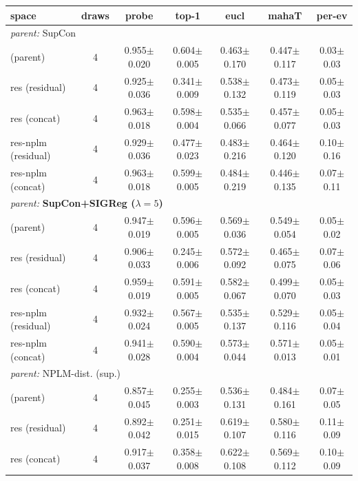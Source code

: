 \begin{table}[t]
\centering
\footnotesize
\begin{tabular}{lcccccc}
\toprule
space & draws & probe & top-1 & eucl & mahaT & per-ev \\
\midrule
\multicolumn{7}{l}{\emph{parent: }SupCon} \\
\quad (parent) & 4 & 0.955$\pm$0.020 & 0.604$\pm$0.005 & 0.463$\pm$0.170 & 0.447$\pm$0.117 & 0.03$\pm$0.03 \\
\quad res (residual) & 4 & 0.925$\pm$0.036 & 0.341$\pm$0.009 & 0.538$\pm$0.132 & 0.473$\pm$0.119 & 0.05$\pm$0.03 \\
\quad res (concat) & 4 & 0.963$\pm$0.018 & 0.598$\pm$0.004 & 0.535$\pm$0.066 & 0.457$\pm$0.077 & 0.05$\pm$0.03 \\
\quad res-nplm (residual) & 4 & 0.929$\pm$0.036 & 0.477$\pm$0.023 & 0.483$\pm$0.216 & 0.464$\pm$0.120 & 0.10$\pm$0.16 \\
\quad res-nplm (concat) & 4 & 0.963$\pm$0.018 & 0.599$\pm$0.005 & 0.484$\pm$0.219 & 0.446$\pm$0.135 & 0.07$\pm$0.11 \\
\multicolumn{7}{l}{\emph{parent: }\textbf{SupCon+SIGReg ($\lambda{=}5$)}} \\
\quad (parent) & 4 & 0.947$\pm$0.019 & 0.596$\pm$0.005 & 0.569$\pm$0.036 & 0.549$\pm$0.054 & 0.05$\pm$0.02 \\
\quad res (residual) & 4 & 0.906$\pm$0.033 & 0.245$\pm$0.006 & 0.572$\pm$0.092 & 0.465$\pm$0.075 & 0.07$\pm$0.06 \\
\quad res (concat) & 4 & 0.959$\pm$0.019 & 0.591$\pm$0.005 & 0.582$\pm$0.067 & 0.499$\pm$0.070 & 0.05$\pm$0.03 \\
\quad res-nplm (residual) & 4 & 0.932$\pm$0.024 & 0.567$\pm$0.005 & 0.535$\pm$0.137 & 0.529$\pm$0.116 & 0.05$\pm$0.04 \\
\quad res-nplm (concat) & 4 & 0.941$\pm$0.028 & 0.590$\pm$0.004 & 0.573$\pm$0.044 & 0.571$\pm$0.013 & 0.05$\pm$0.01 \\
\multicolumn{7}{l}{\emph{parent: }NPLM-dist. (sup.)} \\
\quad (parent) & 4 & 0.857$\pm$0.045 & 0.255$\pm$0.003 & 0.536$\pm$0.131 & 0.484$\pm$0.161 & 0.07$\pm$0.05 \\
\quad res (residual) & 4 & 0.892$\pm$0.042 & 0.251$\pm$0.015 & 0.619$\pm$0.107 & 0.580$\pm$0.116 & 0.11$\pm$0.09 \\
\quad res (concat) & 4 & 0.917$\pm$0.037 & 0.358$\pm$0.008 & 0.622$\pm$0.108 & 0.569$\pm$0.112 & 0.10$\pm$0.09 \\

\end{tabular}
\end{table}
